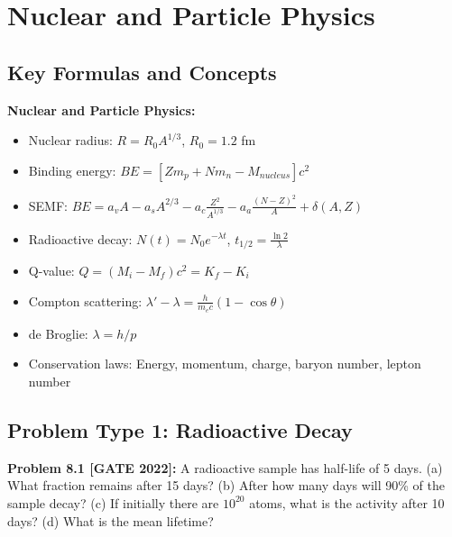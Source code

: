 \documentclass[12pt,a4paper]{article}
\begin{document}
\newpage

\section{Nuclear and Particle Physics}

\subsection{Key Formulas and Concepts}

\begin{theorem}
\textbf{Nuclear and Particle Physics:}
\begin{itemize}
    \item Nuclear radius: $R = R_0 A^{1/3}$, $R_0 = 1.2$ fm
    \item Binding energy: $BE = [Zm_p + Nm_n - M_{nucleus}]c^2$
    \item SEMF: $BE = a_vA - a_sA^{2/3} - a_c\frac{Z^2}{A^{1/3}} - a_a\frac{(N-Z)^2}{A} + \delta(A,Z)$
    \item Radioactive decay: $N(t) = N_0 e^{-\lambda t}$, $t_{1/2} = \frac{\ln 2}{\lambda}$
    \item Q-value: $Q = (M_i - M_f)c^2 = K_f - K_i$
    \item Compton scattering: $\lambda' - \lambda = \frac{h}{m_ec}(1 - \cos\theta)$
    \item de Broglie: $\lambda = h/p$
    \item Conservation laws: Energy, momentum, charge, baryon number, lepton number
\end{itemize}
\end{theorem}

\subsection{Problem Type 1: Radioactive Decay}

\textbf{Problem 8.1 [GATE 2022]:} A radioactive sample has half-life of 5 days.
(a) What fraction remains after 15 days?
(b) After how many days will 90\% of the sample decay?
(c) If initially there are $10^{20}$ atoms, what is the activity after 10 days?
(d) What is the mean lifetime?
\end{document}
